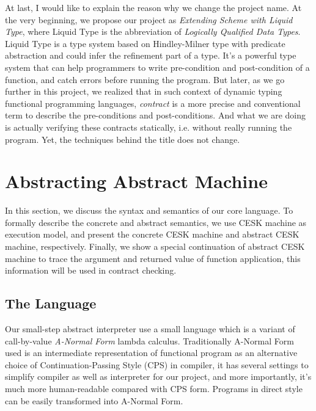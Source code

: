 \documentclass[paper=a4, fontsize=11pt]{scrartcl} %
\numberwithin{equation}{section} %
\numberwithin{figure}{section} %
\numberwithin{table}{section} %
\begin{document}
At last, I would like to explain the reason why we change the project name. At the very beginning, we propose our project as \textit{Extending Scheme with Liquid Type}, where Liquid Type is the abbreviation of \textit{Logically Qualified Data Types}. Liquid Type is a type system based on Hindley-Milner type with predicate abstraction and could infer the refinement part of a type\cite{Rondon:2008:LT:1375581.1375602}. It's a powerful type system that can help programmers to write pre-condition and post-condition of a function, and catch errors before running the program. But later, as we go further in this project, we realized that in such context of dynamic typing functional programming languages, \textit{contract} is a more precise and conventional term to describe the pre-conditions and post-conditions. And what we are doing is actually verifying these contracts statically, i.e. without really running the program. Yet, the techniques behind the title does not change.


\section{Abstracting Abstract Machine}

In this section, we discuss the syntax and semantics of our core language. To formally describe the concrete and abstract semantics, we use CESK machine as execution model, and present the concrete CESK machine and abstract CESK machine, respectively. Finally, we show a special continuation of abstract CESK machine to trace the argument and returned value of function application, this information will be used in contract checking.


\subsection{The Language}

Our small-step abstract interpreter use a small language which is a variant of call-by-value \textit{A-Normal Form} lambda calculus\cite{Flanagan:1993:ECC:155090.155113}. Traditionally A-Normal Form used is an intermediate representation of functional program as an alternative choice of Continuation-Passing Style (CPS) in compiler, it has several settings to simplify compiler as well as interpreter for our project, and more importantly, it's much more human-readable compared with CPS form. Programs in direct style can be easily transformed into A-Normal Form\cite{Flanagan:1993:ECC:155090.155113}.
\end{document}
